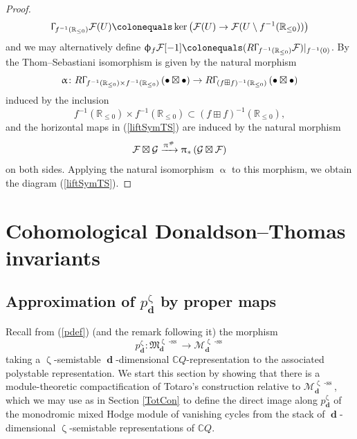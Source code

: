 \documentclass[a4paper,10pt]{amsart}
\renewcommand{\alpha}{\upalpha}
\renewcommand{\zeta}{\upzeta}
\renewcommand{\pi}{\uppi\hspace{0.05em}}
\renewcommand{\Gamma}{\Upgamma}
\renewcommand{\phi}{\upphi}
\newcommand{\Mst}{\mathfrak{M}}
\newcommand{\Msp}{\mathcal{M}}
\DeclareMathOperator{\sst}{-ss}
\DeclareMathOperator{\dd}{\mathbf{d}}
\begin{document}
\begin{proof}
\[
\Gamma_{f^{-1}(\mathbb{R}_{\leq 0})}\mathcal{F}(U)\colonequals \ker\left(\mathcal{F}(U)\rightarrow \mathcal{F}(U\setminus f^{-1}(\mathbb{R}_{\leq 0}))\right)
\]
and we may alternatively define $\phi_f\mathcal{F}[-1]\colonequals (R\Gamma_{f^{-1}(\mathbb{R}_{\leq 0})}\mathcal{F})|_{f^{-1}(0)}$.  By \cite[Prop.A.2]{Br12} \cite{Ma01} the Thom--Sebastiani isomorphism is given by the natural morphism
\[
\alpha\colon R\Gamma_{f^{-1}(\mathbb{R}_{\leq 0})\times f^{-1}(\mathbb{R}_{\leq 0})}\left(\bullet \boxtimes\bullet\right)\rightarrow R\Gamma_{(f\boxplus f)^{-1}(\mathbb{R}_{\leq 0})}\left(\bullet\boxtimes\bullet\right)
\]
induced by the inclusion 
\[
f^{-1}(\mathbb{R}_{\leq 0})\times f^{-1}(\mathbb{R}_{\leq 0})\subset (f\boxplus f)^{-1}(\mathbb{R}_{\leq 0}),
\]
and the horizontal maps in (\ref{liftSymTS}) are induced by the natural morphism
\[
\mathcal{F}\boxtimes \mathcal{G}\xrightarrow{\pi^\#}\pi_*\left(\mathcal{G}\boxtimes\mathcal{F}\right)
\]
on both sides.  Applying the natural isomorphism $\alpha$ to this morphism, we obtain the diagram (\ref{liftSymTS}).
\end{proof}


\section{Cohomological Donaldson--Thomas invariants}
\label{CoDTSec}
\subsection{Approximation of $p^{\zeta}_{\dd}$ by proper maps}
\label{cohaDT}
Recall from (\ref{pdef}) (and the remark following it) the morphism
\[
p^{\zeta}_{\dd}\colon \Mst^{\zeta\sst}_{\dd}\rightarrow\Msp^{\zeta\sst}_{\dd}
\]
taking a $\zeta$-semistable $\dd$-dimensional $\mathbb{C}Q$-representation to the associated polystable representation.  We start this section by showing that there is a module-theoretic compactification of Totaro's construction relative to $\Msp^{\zeta\sst}_{\dd}$, which we may use as in Section \ref{TotCon} to define the direct image along $p^{\zeta}_{\dd}$ of the monodromic mixed Hodge module of vanishing cycles from the stack of $\dd$-dimensional $\zeta$-semistable representations of $\mathbb{C}Q$.  
\end{document}
